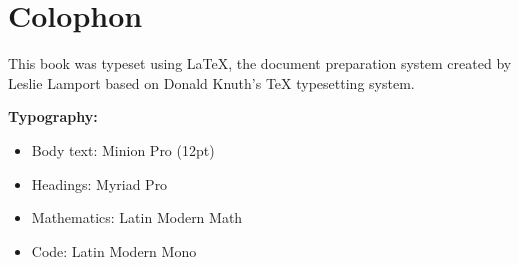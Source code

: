\documentclass[11pt,oneside]{book}
\begin{document}
% 

% 




\backmatter

\backmatter

\printbibliography[heading=bibintoc,title={Bibliography}]



\printindex

\chapter*{Colophon}

This book was typeset using \LaTeX{}, the document preparation system created by Leslie Lamport based on Donald Knuth's \TeX{} typesetting system.

\textbf{Typography:}
\begin{itemize}
\item Body text: Minion Pro (12pt)
\item Headings: Myriad Pro
\item Mathematics: Latin Modern Math
\item Code: Latin Modern Mono
\end{itemize}
\end{document}

